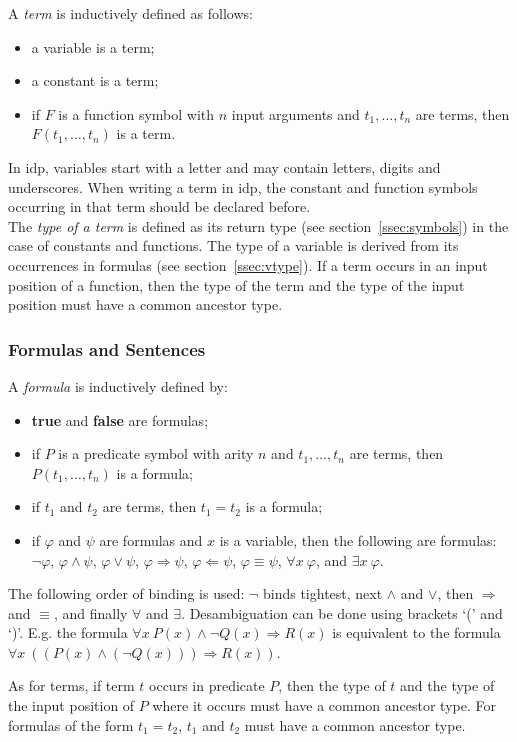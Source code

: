 \documentclass[a4]{article}
\newcommand{\idp}{{\sc idp}\xspace}
\newcommand{\lir}{\Rightarrow}
\newcommand{\ril}{\Leftarrow}
\begin{document}
A \emph{term} is inductively defined as follows:
\begin{itemize}
	\item a variable is a term;
	\item a constant is a term;
	\item if $F$ is a function symbol with $n$ input arguments and $t_1, \ldots, t_n$ are terms, then $F(t_1,\ldots,t_n)$ is a term. 
\end{itemize}
In \idp, variables start with a letter and may contain letters, digits and underscores. When writing a term in \idp, the constant and function symbols occurring in that term should be declared before. \\
The \emph{type of a term} is defined as its return type (see section~\ref{ssec:symbols}) in the case of constants and functions. The type of a variable is derived from its occurrences in formulas (see section~\ref{ssec:vtype}). If a term occurs in an input position of a function, then the type of the term and the type of the input position must have a common ancestor type. 

\subsubsection{Formulas and Sentences}

A \emph{formula} is inductively defined by:
\begin{itemize}
	\item \textbf{true} and \textbf{false} are formulas;
	\item if $P$ is a predicate symbol with arity $n$ and $t_1,\ldots,t_n$ are terms, then $P(t_1,\ldots,t_n)$ is a formula;
	\item if $t_1$ and $t_2$ are terms, then $t_1 = t_2$ is a formula;
	\item if $\varphi$ and $\psi$ are formulas and $x$ is a variable, then the following are formulas: $\neg \varphi$, $\varphi \wedge \psi$, $\varphi \vee \psi$, $\varphi \lir \psi$, $\varphi \ril \psi$, $\varphi \equiv \psi$, $\forall x\ \varphi$, and $\exists x\ \varphi$.
\end{itemize}
The following order of binding is used: $\neg$ binds tightest, next $\wedge$ and $\vee$, then $\lir$ and $\equiv$, and finally $\forall$ and $\exists$. Desambiguation can be done using brackets `(' and `)'. E.g. the formula $\forall x\ P(x) \wedge \neg Q(x) \lir R(x)$ is equivalent to the formula $\forall x\ ((P(x) \wedge (\neg Q(x))) \lir R(x))$.

As for terms, if term $t$ occurs in predicate $P$, then the type of $t$ and the type of the input position of $P$ where it occurs must have a common ancestor type. For formulas of the form $t_1 = t_2$, $t_1$ and $t_2$ must have a common ancestor type.
\end{document}
